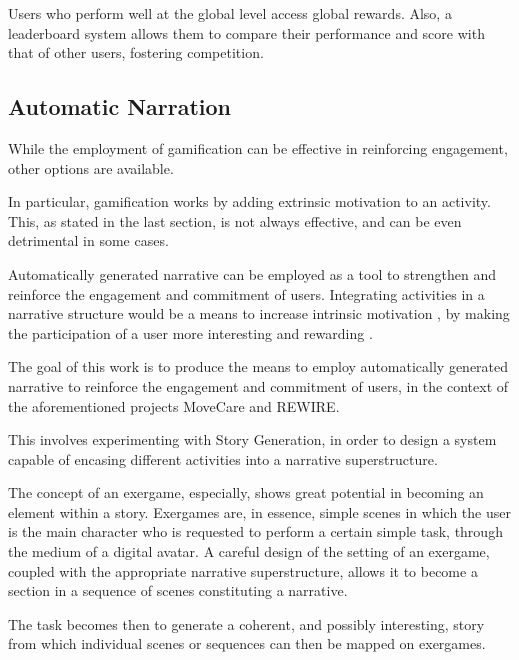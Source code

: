 \documentclass[12pt,a4paper,oneside]{report}
\begin{document}
Users who perform well at the global level access global rewards.
Also, a leaderboard system allows them to compare their performance and score with that of other users, fostering competition.

\pagebreak


\subsection{Automatic Narration}

While the employment of gamification can be effective in reinforcing engagement, other options are available.

In particular, gamification works by adding extrinsic motivation to an activity. This, as stated in the last section, is not always effective, and can be even detrimental in some cases.

\bigskip

Automatically generated narrative can be employed as a tool to strengthen and reinforce the engagement and commitment of users. Integrating activities in a narrative structure would be a means to increase intrinsic motivation \cite{green2004understanding}, by making the participation of a user more interesting and rewarding \cite{sweetser2005gameflow}.

\bigskip

The goal of this work is to produce the means to employ automatically generated narrative to reinforce the engagement and commitment of users, in the context of the aforementioned projects MoveCare and REWIRE.

\bigskip

This involves experimenting with Story Generation, in order to design a system capable of encasing different activities into a narrative superstructure.

The concept of an exergame, especially, shows great potential in becoming an element within a story. Exergames are, in essence, simple scenes in which the user is the main character who is requested to perform a certain simple task, through the medium of a digital avatar. A careful design of the setting of an exergame, coupled with the appropriate narrative superstructure, allows it to become a section in a sequence of scenes constituting a narrative.

The task becomes then to generate a coherent, and possibly interesting, story from which individual scenes or sequences can then be mapped on exergames.

\bigskip
\end{document}
